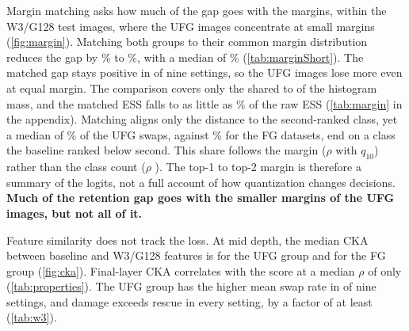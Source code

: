 Margin matching asks how much of the gap goes with the margins, within the W3/G128 test images, where the UFG images concentrate at small margins (\cref{fig:margin}).
Matching both groups to their common margin distribution reduces the gap by \% to \%, with a median of \% (\cref{tab:marginShort}).
The matched gap stays positive in  of nine settings, so the UFG images lose more even at equal margin.
The comparison covers only the shared  to  of the histogram mass, and the matched ESS falls to as little as \% of the raw ESS (\cref{tab:margin} in the appendix).
Matching aligns only the distance to the second-ranked class, yet a median of \% of the UFG swaps, against \% for the FG datasets, end on a class the baseline ranked below second.
This share follows the margin ($\rho$  with $q_{10}$) rather than the class count ($\rho$ ).
The top-1 to top-2 margin is therefore a summary of the logits, not a full account of how quantization changes decisions.
\textbf{Much of the retention gap goes with the smaller margins of the UFG images, but not all of it.}

Feature similarity does not track the loss.
At mid depth, the median CKA between baseline and W3/G128 features is  for the UFG group and  for the FG group (\cref{fig:cka}).
Final-layer CKA correlates with the score at a median $\rho$ of only  (\cref{tab:properties}).
The UFG group has the higher mean swap rate in  of nine settings, and damage exceeds rescue in every setting, by a factor of at least  (\cref{tab:w3}).
